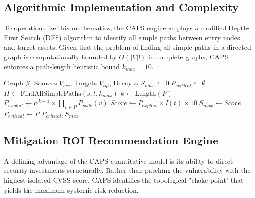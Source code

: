\subsection{Algorithmic Implementation and Complexity}
To operationalize this mathematics, the CAPS engine employs a modified Depth-First Search (DFS) algorithm to identify all simple paths between entry nodes and target assets. Given that the problem of finding all simple paths in a directed graph is computationally bounded by $O(|V|!)$ in complete graphs, CAPS enforces a path-length heuristic bound $k_{max} = 10$. 

\begin{algorithm}[h]
\caption{CAPS Critical Path Discovery}
\label{alg:caps}
\begin{algorithmic}[1]
\REQUIRE Graph $\mathcal{G}$, Sources $V_{src}$, Targets $V_{tgt}$, Decay $\alpha$
\STATE $S_{max} \leftarrow 0$
\STATE $P_{critical} \leftarrow \emptyset$
        \STATE $\Pi \leftarrow \text{FindAllSimplePaths}(s, t, k_{max})$
            \STATE $k \leftarrow \text{Length}(P)$
            \STATE $P_{exploit} \leftarrow \alpha^{k-1} \times \prod_{v \in P} P_{node}(v)$
            \STATE $Score \leftarrow P_{exploit} \times I(t) \times 10$
                \STATE $S_{max} \leftarrow Score$
                \STATE $P_{critical} \leftarrow P$
            \ENDIF
        \ENDFOR
    \ENDFOR
\ENDFOR
\RETURN $P_{critical}, S_{max}$
\end{algorithmic}
\end{algorithm}

\subsection{Mitigation ROI Recommendation Engine}
A defining advantage of the CAPS quantitative model is its ability to direct security investments structurally. Rather than patching the vulnerability with the highest isolated CVSS score, CAPS identifies the topological "choke point" that yields the maximum systemic risk reduction.


